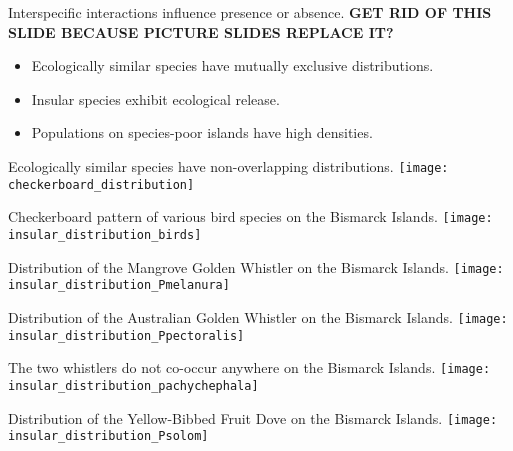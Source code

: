 \documentclass[xcolor=svgnames]{beamer}
\begin{document}
\begin{frame}{Interspecific interactions influence presence or absence.}
\textbf{GET RID OF THIS SLIDE BECAUSE PICTURE SLIDES REPLACE IT?}
	\begin{itemize}
		\item Ecologically similar species have mutually exclusive distributions.
		\pause
		\vfill \item Insular species exhibit ecological release.
		\pause
		\vfill \item Populations on species-poor islands have high densities.
	\end{itemize}
\end{frame}

\begin{frame}{Ecologically similar species have non-overlapping distributions.}
	\centering
		\texttt{[image: checkerboard\_distribution]}\\
\end{frame}

\begin{frame}{Checkerboard pattern of various bird species on the Bismarck Islands.}
	\centering
		\texttt{[image: insular\_distribution\_birds]}\\
\end{frame}

\begin{frame}{Distribution of the Mangrove Golden Whistler on the Bismarck Islands.}
	\centering
		\texttt{[image: insular\_distribution\_Pmelanura]}\\
\end{frame}

\begin{frame}{Distribution of the Australian Golden Whistler on the Bismarck Islands.}
	\centering
		\texttt{[image: insular\_distribution\_Ppectoralis]}\\
\end{frame}

\begin{frame}{The two whistlers do not co-occur anywhere on the Bismarck Islands.}
	\centering
		\texttt{[image: insular\_distribution\_pachychephala]}\\
\end{frame}

\begin{frame}{Distribution of the Yellow-Bibbed Fruit Dove on the Bismarck Islands.}
	\centering
		\texttt{[image: insular\_distribution\_Psolom]}\\
\end{frame}
\end{document}
